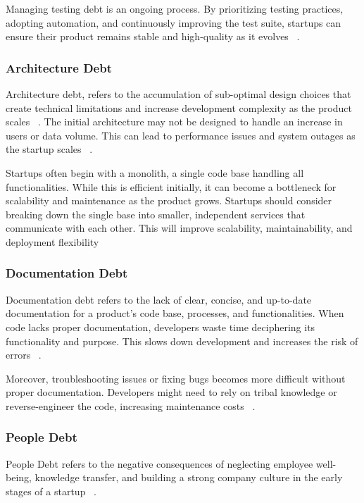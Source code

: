 Managing testing debt is an ongoing process. By prioritizing testing practices, adopting automation, and continuously improving the test suite, startups can ensure their product remains stable and high-quality as it evolves ~\cite{CrowneWhyStartupsFail, 1NewMess49:online}.

\subsubsection{Architecture Debt}
Architecture debt, refers to the accumulation of sub-optimal design choices that create technical limitations and increase development complexity as the product scales ~\cite{Startups4:online}. The initial architecture may not be designed to handle an increase in users or data volume. This can lead to performance issues and system outages as the startup scales ~\cite{Qualityv77:online}.

Startups often begin with a monolith, a single code base handling all functionalities. While this is efficient initially, it can become a bottleneck for scalability and maintenance as the product grows. Startups should consider breaking down the single base into smaller, independent services that communicate with each other. This will improve scalability, maintainability, and deployment flexibility ~\cite{Howtohan98:online, DesignSt86:online}

\subsubsection{Documentation Debt}
Documentation debt refers to the lack of clear, concise, and up-to-date documentation for a product's code base, processes, and functionalities. When code lacks proper documentation, developers waste time deciphering its functionality and purpose. This slows down development and increases the risk of errors ~\cite{The3Best94:online, 10.1145/3493244.3493254}.

Moreover, troubleshooting issues or fixing bugs becomes more difficult without proper documentation. Developers might need to rely on tribal knowledge or reverse-engineer the code, increasing maintenance costs ~\cite{DesignSt86:online}.

\subsubsection{People Debt}
People Debt refers to the negative consequences of neglecting employee well-being, knowledge transfer, and building a strong company culture in the early stages of a startup ~\cite{Blog21:online}. 


